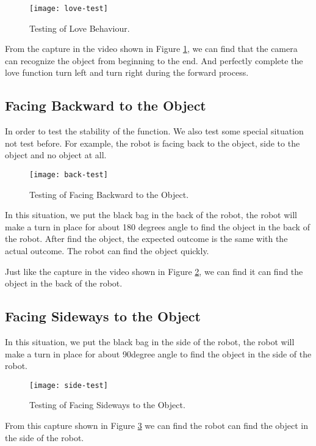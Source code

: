 \begin{figure}
\centering
\texttt{[image: love-test]}
\caption{Testing of Love Behaviour.}
\label{fig:love-test}
\end{figure}

From the capture in the video shown in Figure \ref{fig:love-test}, we can find that the camera can recognize the object from beginning to the end. And perfectly complete the love function turn left and turn right during the forward process.

\subsection{Facing Backward to the Object}

In order to test the stability of the function. We also test some special situation not test before. For example, the robot is facing back to the object, side to the object and no object at all.

\begin{figure}
\centering
\texttt{[image: back-test]}
\caption{Testing of Facing Backward to the Object.}
\label{fig:back-test}
\end{figure}


In this situation, we put the black bag in the back of the robot, the robot will make a turn in place for about 180 degrees angle to find the object in the back of the robot. After find the object, the expected outcome is the same with the actual outcome. The robot can find the object quickly.

Just like the capture in the video shown in Figure \ref{fig:back-test}, we can find it can find the object in the back of the robot.

\subsection{Facing Sideways to the Object}

In this situation, we put the black bag in the side of the robot, the robot will make a turn in place for about 90degree angle to find the object in the side of the robot.

\begin{figure}
\centering
\texttt{[image: side-test]}
\caption{Testing of Facing Sideways to the Object.}
\label{fig:side-test}
\end{figure}

From this capture shown in Figure \ref{fig:side-test} we can find the robot can find the object in the side of the robot.

